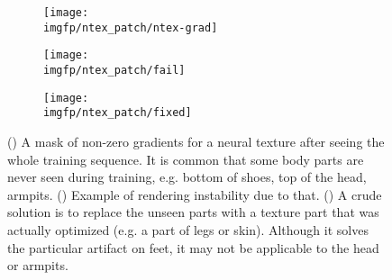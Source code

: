 \begin{figure}
	\centering
	\begin{subfigure}[b]{0.35\textwidth}
		\centering
		\texttt{[image: \\imgfp/ntex\_patch/ntex-grad]}%
		\caption{}
		\label{fig:ntex-grad}
	\end{subfigure}
	\hfill
	\begin{subfigure}[b]{0.3\textwidth}
		\centering
		\texttt{[image: \\imgfp/ntex\_patch/fail]}
		\caption{}
		\label{fig:ntex-artifact}
	\end{subfigure}
	\hfill
	\begin{subfigure}[b]{0.3\textwidth}
		\centering
		\texttt{[image: \\imgfp/ntex\_patch/fixed]}
		\caption{}
		\label{fig:ntex-fixed}
	\end{subfigure}
	\caption{(\protect{}) A mask of non-zero gradients for a neural texture after seeing the whole training sequence. It is common that some body parts are never seen during training, e.g. bottom of shoes, top of the head, armpits. (\protect{}) Example of rendering instability due to that. (\protect{}) A crude solution is to replace the unseen parts with a texture part that was actually optimized (e.g. a part of legs or skin). Although it solves the particular artifact on feet, it may not be applicable to the head or armpits.}
	\label{fig:ntex-grad-artifact-fixed}
\end{figure}

